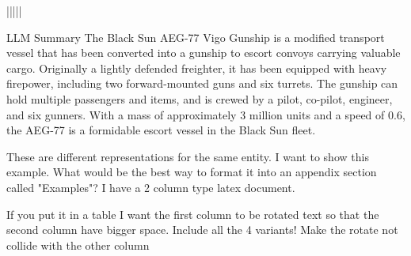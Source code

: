 \documentclass[11pt]{article}
\begin{document}
|||||

LLM Summary
 The Black Sun AEG-77 Vigo Gunship is a modified transport vessel that has been converted into a gunship to escort convoys carrying valuable cargo. Originally a lightly defended freighter, it has been equipped with heavy firepower, including two forward-mounted guns and six turrets. The gunship can hold multiple passengers and items, and is crewed by a pilot, co-pilot, engineer, and six gunners. With a mass of approximately 3 million units and a speed of 0.6, the AEG-77 is a formidable escort vessel in the Black Sun fleet.





These are different representations for the same entity. I want to show this example. What would be the best way to format it into an appendix section called "Examples"? I have a 2 column type latex document. 

If you put it in a table I want the first column to be rotated text so that the second column have bigger space. Include all the 4 variants! Make the rotate not collide with the other column
\end{document}
